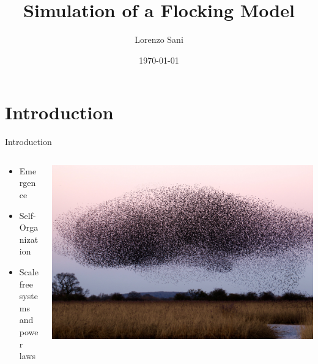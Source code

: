 \documentclass{beamer}
\title[Simple Flocking]{Simulation of a Flocking Model}
\author{Lorenzo Sani}
\institute{Università degli Studi di Bologna}
\date{\today}
\begin{document}
\begin{frame}
  \titlepage
\end{frame}


\section{Introduction}

\begin{frame}{Introduction}
\begin{minipage}[0.95\textheight]{\textwidth}
\begin{columns}[T]
\begin{column}{0.30\textwidth}
\begin{itemize}
  \item Emergence
  \vspace{0.5cm}
  \item Self-Organization
  \vspace{0.5cm}
  \item Scale free systems\\ and power laws
\end{itemize}
\end{column}
\begin{column}{0.65\textwidth}
\includegraphics[width=\textwidth, keepaspectratio]{../images/flock_image.jpeg}
\end{column}
\end{columns}
\end{minipage}
\end{frame}
\end{document}
